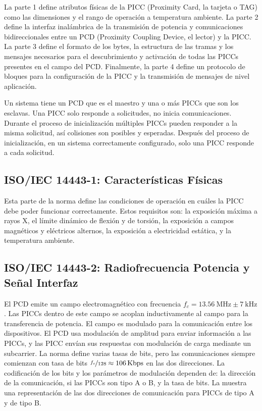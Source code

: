 \documentclass[a4paper, twoside, 11pt]{report}
\begin{document}
La parte 1 define atributos físicas de la PICC (Proximity Card, la tarjeta o TAG) como las dimensiones y el rango de operación a temperatura ambiente. La parte 2 define la interfaz inalámbrica de la transmisión de potencia y comunicaciones bidireccionales entre un PCD (Proximity Coupling Device, el lector) y la PICC. La parte 3 define el formato de los bytes, la estructura de las tramas y los mensajes necesarios para el descubrimiento y activación de todas las PICCs presentes en el campo del PCD. Finalmente, la parte 4 define un protocolo de bloques para la configuración de la PICC y la transmisión de mensajes de nivel aplicación.

Un sistema tiene un PCD que es el maestro y una o más PICCs que son los esclavas. Una PICC solo responde a solicitudes, no inicia comunicaciones. Durante el proceso de inicialización múltiples PICCs pueden responder a la misma solicitud, así colisiones son posibles y esperadas. Después del proceso de inicialización, en un sistema correctamente configurado, solo una PICC responde a cada solicitud.

\FloatBarrier
\subsection{ISO/IEC 14443-1: \large{Características Físicas}}

Esta parte de la norma define las condiciones de operación en cuáles la PICC debe poder funcionar correctamente. Estos requisitos son: la exposición máxima a rayos X, el límite dinámico de flexión y de torsión, la exposición a campos magnéticos y eléctricos alternos, la exposición a electricidad estática, y la temperatura ambiente\cite{iso14443-1}.

\FloatBarrier
\subsection{ISO/IEC 14443-2: \large{Radiofrecuencia Potencia y Señal Interfaz}}
\label{sec:introduction_iso14443-2}

El PCD emite un campo electromagnético con frecuencia $f_c = \SI{13.56}{\mega\hertz} \pm \SI{7}{\kilo\hertz}$. Las PICCs dentro de este campo se acoplan inductivamente al campo para la transferencia de potencia. El campo es modulado para la comunicación entre los dispositivos. El PCD usa modulación de amplitud para enviar información a las PICCs, y las PICC envían sus respuestas con modulación de carga mediante un subcarrier. La norma define varias tasas de bits, pero las comunicaciones siempre comienzan con tasa de bits $\nicefrac{f_c}{128} \approx \SI{106}{Kbps}$ en las dos direcciones. La codificación de los bits y los parámetros de modulación dependen de: la dirección de la comunicación, si las PICCs son tipo A o B, y la tasa de bits. La  muestra una representación de las dos direcciones de comunicación para PICCs de tipo A y de tipo B.
\end{document}
